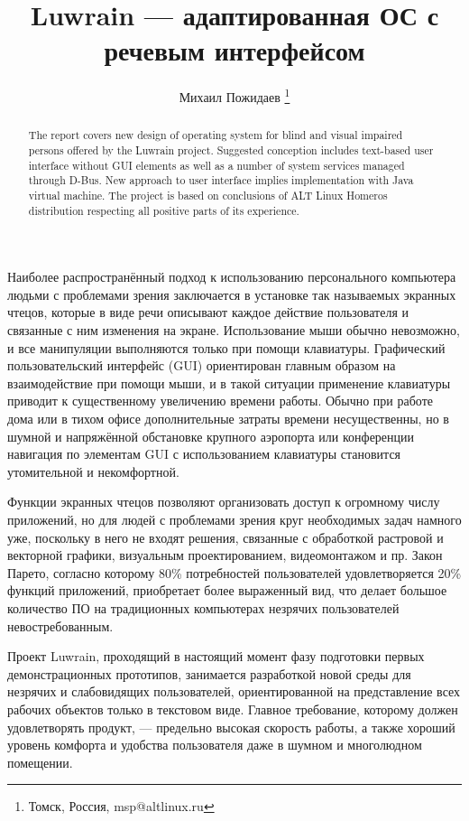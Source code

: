 \documentclass[10pt, a5paper]{article}
\begin{document}
\title{Luwrain — адаптированная ОС с речевым интерфейсом}
\author{Михаил Пожидаев \footnote{Томск, Россия, msp@altlinux.ru}}
\maketitle
\begin{abstract}
The report covers new design of operating system for blind and visual impaired persons offered by the Luwrain project. Suggested conception includes text-based user interface without GUI elements as well as a number of system services managed through D-Bus. New approach to user interface implies implementation with Java virtual machine. The project is based on conclusions of ALT Linux Homeros distribution respecting all positive parts of its experience.
\end{abstract}
Наиболее распространённый подход к использованию персонального компьютера людьми с проблемами зрения заключается в установке так называемых экранных чтецов, которые в виде речи описывают каждое действие пользователя и связанные с ним изменения на экране. Использование мыши обычно невозможно, и все манипуляции выполняются только при помощи клавиатуры. Графический пользовательский интерфейс (GUI) ориентирован главным образом на взаимодействие при помощи мыши, и в такой ситуации применение клавиатуры приводит к существенному увеличению времени работы. Обычно при работе дома или в тихом офисе дополнительные затраты времени несущественны, но в шумной и напряжённой обстановке крупного аэропорта или конференции навигация по элементам GUI с использованием клавиатуры становится утомительной и некомфортной.

Функции экранных чтецов позволяют организовать доступ к огромному числу приложений, но для людей с проблемами зрения круг необходимых задач намного уже, поскольку в него не входят решения, связанные с обработкой растровой и векторной графики, визуальным проектированием, видеомонтажом и пр. Закон Парето, согласно которому 80\% потребностей пользователей удовлетворяется 20\% функций приложений, приобретает более выраженный вид, что делает большое количество ПО на традиционных компьютерах незрячих пользователей невостребованным.

Проект Luwrain, проходящий в настоящий момент фазу подготовки первых демонстрационных прототипов, занимается разработкой новой среды для незрячих и слабовидящих пользователей, ориентированной на представление всех рабочих объектов только в текстовом виде. Главное требование, которому должен удовлетворять продукт, — предельно высокая скорость работы, а также хороший уровень комфорта и удобства пользователя даже в шумном и многолюдном помещении.
\end{document}
